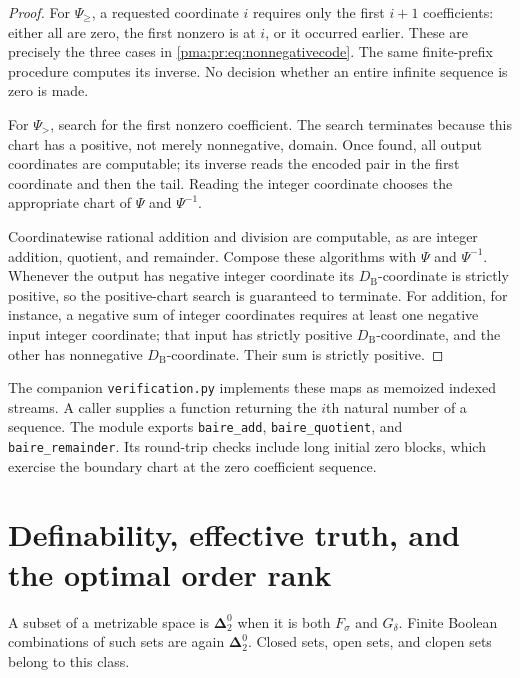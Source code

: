 \documentclass[11pt]{article}
\numberwithin{equation}{section}
\theoremstyle{definition}
\theoremstyle{remark}
\newcommand{\Dtwo}{\boldsymbol{\Delta}^{0}_{2}}
\newcommand{\code}[1]{\texttt{\small #1}}
\begin{document}
\begin{proof}
For $\Psi_{\geq}$, a requested coordinate $i$ requires only the first $i+1$
coefficients: either all are zero, the first nonzero is at $i$, or it occurred
earlier. These are precisely the three cases in
\eqref{pma:pr:eq:nonnegativecode}. The same finite-prefix procedure computes its
inverse. No decision whether an entire infinite sequence is zero is made.

For $\Psi_{>}$, search for the first nonzero coefficient. The search terminates
because this chart has a positive, not merely nonnegative, domain. Once
found, all output coordinates are computable; its inverse reads the encoded
pair in the first coordinate and then the tail. Reading the integer
coordinate chooses the appropriate chart of $\Psi$ and $\Psi^{-1}$.

Coordinatewise rational addition and division are computable, as are
integer addition, quotient, and remainder. Compose these algorithms with
$\Psi$ and $\Psi^{-1}$. Whenever the output has negative integer coordinate its
$D_{\mathrm B}$-coordinate is strictly positive, so the positive-chart search
is guaranteed to terminate. For addition, for instance, a negative sum of
integer coordinates requires at least one negative input integer coordinate;
that input has strictly positive $D_{\mathrm B}$-coordinate, and the other has
nonnegative $D_{\mathrm B}$-coordinate. Their sum is strictly positive.
\end{proof}

The companion \code{verification.py} implements these maps as memoized
indexed streams. A caller supplies a function returning the $i$th natural
number of a sequence. The module exports \code{baire\_add},
\code{baire\_quotient}, and \code{baire\_remainder}. Its round-trip checks
include long initial zero blocks, which exercise the boundary chart at the
zero coefficient sequence.

\section{Definability, effective truth, and the optimal order rank}
\label{pma:pr:sec:borel}

A subset of a metrizable space is $\Dtwo$ when it is both $F_\sigma$ and
$G_\delta$. Finite Boolean combinations of such sets are again $\Dtwo$.
Closed sets, open sets, and clopen sets belong to this class.
\end{document}
